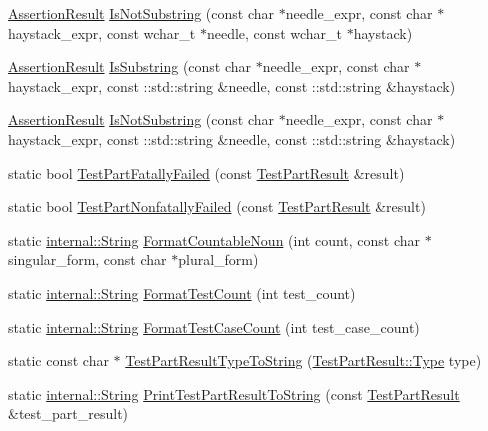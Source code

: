 \begin{DoxyCompactItemize}
\item 
\hyperlink{classtesting_1_1AssertionResult}{\-Assertion\-Result} \hyperlink{namespacetesting_ae7bf7bebcf58a8ade5f13be1c274db1d}{\-Is\-Not\-Substring} (const char $\ast$needle\-\_\-expr, const char $\ast$haystack\-\_\-expr, const wchar\-\_\-t $\ast$needle, const wchar\-\_\-t $\ast$haystack)
\item 
\hyperlink{classtesting_1_1AssertionResult}{\-Assertion\-Result} \hyperlink{namespacetesting_af277c788bf038cc9fd0baf33862f693d}{\-Is\-Substring} (const char $\ast$needle\-\_\-expr, const char $\ast$haystack\-\_\-expr, const \-::std\-::string \&needle, const \-::std\-::string \&haystack)
\item 
\hyperlink{classtesting_1_1AssertionResult}{\-Assertion\-Result} \hyperlink{namespacetesting_a82240dc86e7ace0508ad37a2ac7f019b}{\-Is\-Not\-Substring} (const char $\ast$needle\-\_\-expr, const char $\ast$haystack\-\_\-expr, const \-::std\-::string \&needle, const \-::std\-::string \&haystack)
\item 
static bool \hyperlink{namespacetesting_a88dd754d53baae013bf937f960e67306}{\-Test\-Part\-Fatally\-Failed} (const \hyperlink{classtesting_1_1TestPartResult}{\-Test\-Part\-Result} \&result)
\item 
static bool \hyperlink{namespacetesting_a650fdc14846c63608fb1c0810bf2b5ca}{\-Test\-Part\-Nonfatally\-Failed} (const \hyperlink{classtesting_1_1TestPartResult}{\-Test\-Part\-Result} \&result)
\item 
static \hyperlink{classtesting_1_1internal_1_1String}{internal\-::\-String} \hyperlink{namespacetesting_aefca65bdfcf981c1e55c7d90e14a263f}{\-Format\-Countable\-Noun} (int count, const char $\ast$singular\-\_\-form, const char $\ast$plural\-\_\-form)
\item 
static \hyperlink{classtesting_1_1internal_1_1String}{internal\-::\-String} \hyperlink{namespacetesting_a9e35e748b0be521a7c14047d3cab12b2}{\-Format\-Test\-Count} (int test\-\_\-count)
\item 
static \hyperlink{classtesting_1_1internal_1_1String}{internal\-::\-String} \hyperlink{namespacetesting_a62a889fb8f600d386c9c75951b0a45b7}{\-Format\-Test\-Case\-Count} (int test\-\_\-case\-\_\-count)
\item 
static const char $\ast$ \hyperlink{namespacetesting_a3095c11c161dad676777579f3619d016}{\-Test\-Part\-Result\-Type\-To\-String} (\hyperlink{classtesting_1_1TestPartResult_a1d1cfd8ffb84e947f82999c682b666a7}{\-Test\-Part\-Result\-::\-Type} type)
\item 
static \hyperlink{classtesting_1_1internal_1_1String}{internal\-::\-String} \hyperlink{namespacetesting_aa72a7aad5f2a9ccde41699f09348160a}{\-Print\-Test\-Part\-Result\-To\-String} (const \hyperlink{classtesting_1_1TestPartResult}{\-Test\-Part\-Result} \&test\-\_\-part\-\_\-result)

\end{DoxyCompactItemize}
